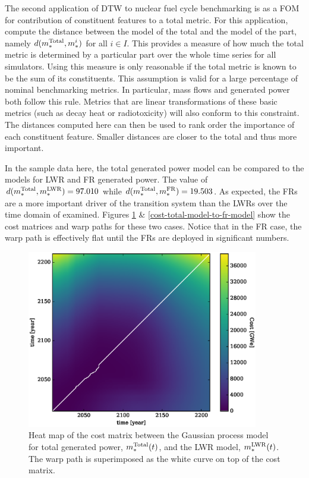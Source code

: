 The second application of DTW to nuclear fuel cycle benchmarking is as a
FOM for contribution of constituent features to a total metric. For this application, 
compute the distance between the model of the total and the model of the 
part, namely $d(m_*^{\mathrm{Total}}, m_*^i)$ for all $i \in I$. This provides a 
measure of how much the total metric is determined by a particular part
over the whole time series for all simulators.
Using this measure is only reasonable if the total metric is known 
to be the sum of its constituents.  This assumption is valid for 
a large percentage of nominal benchmarking metrics. In particular, 
mass flows and generated power both follow this rule. Metrics that are 
linear transformations of these basic metrics (such as decay heat or 
radiotoxicity) will also conform to this constraint. The distances computed here
can then be used to rank order the importance of each constituent feature. 
Smaller distances are closer to the total and thus more important.

In the sample data here, the total generated power model can be compared to 
the models for LWR and FR generated power. The value of 
$d(m_*^{\mathrm{Total}}, m_*^{\mathrm{LWR}}) = 97.010$ while $d(m_*^{\mathrm{Total}}, m_*^{\mathrm{FR}}) = 19.503$.
As expected, the FRs are a more important driver of the transition system 
than the LWRs over the time domain of examined. Figures 
\ref{cost-total-model-to-lwr-model} \& \ref{cost-total-model-to-fr-model}
show the cost matrices and warp paths for these two cases.  Notice that in the
FR case, the warp path is effectively flat until the FRs are deployed in 
significant numbers. 
 
\begin{figure}[htb]
\centering
\includegraphics[width=0.9\textwidth]{cost-total-model-to-lwr-model.eps}
\caption{Heat map of the cost matrix between the Gaussian process model 
for total generated power, $m_*^{\mathrm{Total}}(t)$, and the LWR model, 
$m_*^{\mathrm{LWR}}(t)$.
The warp path is superimposed as the white curve on top of the cost matrix.}
\label{cost-total-model-to-lwr-model}
\end{figure}

